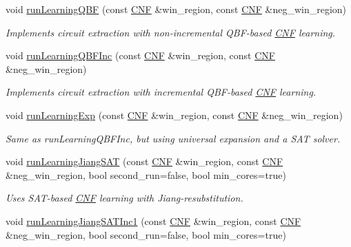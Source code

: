 \begin{DoxyCompactItemize}
\item 
void \hyperlink{classLearningImplExtractor_a009b5382cc9a65cd7c7dfbbc73815bac}{run\-Learning\-Q\-B\-F} (const \hyperlink{classCNF}{C\-N\-F} \&win\-\_\-region, const \hyperlink{classCNF}{C\-N\-F} \&neg\-\_\-win\-\_\-region)
\begin{DoxyCompactList}\small\item\em Implements circuit extraction with non-\/incremental Q\-B\-F-\/based \hyperlink{classCNF}{C\-N\-F} learning. \end{DoxyCompactList}\item 
void \hyperlink{classLearningImplExtractor_a3edc5671d6f56dea4145512385063681}{run\-Learning\-Q\-B\-F\-Inc} (const \hyperlink{classCNF}{C\-N\-F} \&win\-\_\-region, const \hyperlink{classCNF}{C\-N\-F} \&neg\-\_\-win\-\_\-region)
\begin{DoxyCompactList}\small\item\em Implements circuit extraction with incremental Q\-B\-F-\/based \hyperlink{classCNF}{C\-N\-F} learning. \end{DoxyCompactList}\item 
void \hyperlink{classLearningImplExtractor_aa61a9c39a6cb6e6e04eeb3ca876e50be}{run\-Learning\-Exp} (const \hyperlink{classCNF}{C\-N\-F} \&win\-\_\-region, const \hyperlink{classCNF}{C\-N\-F} \&neg\-\_\-win\-\_\-region)
\begin{DoxyCompactList}\small\item\em Same as run\-Learning\-Q\-B\-F\-Inc, but using universal expansion and a S\-A\-T solver. \end{DoxyCompactList}\item 
void \hyperlink{classLearningImplExtractor_a39668b94568dde5459d979684d99253f}{run\-Learning\-Jiang\-S\-A\-T} (const \hyperlink{classCNF}{C\-N\-F} \&win\-\_\-region, const \hyperlink{classCNF}{C\-N\-F} \&neg\-\_\-win\-\_\-region, bool second\-\_\-run=false, bool min\-\_\-cores=true)
\begin{DoxyCompactList}\small\item\em Uses S\-A\-T-\/based \hyperlink{classCNF}{C\-N\-F} learning with Jiang-\/resubstitution. \end{DoxyCompactList}\item 
void \hyperlink{classLearningImplExtractor_a036ab2a3921696d31fb55139427d2114}{run\-Learning\-Jiang\-S\-A\-T\-Inc1} (const \hyperlink{classCNF}{C\-N\-F} \&win\-\_\-region, const \hyperlink{classCNF}{C\-N\-F} \&neg\-\_\-win\-\_\-region, bool second\-\_\-run=false, bool min\-\_\-cores=true)

\end{DoxyCompactItemize}
